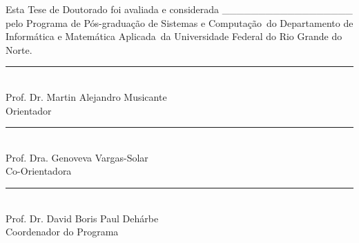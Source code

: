 

\begin{center}
 

  {
    \fontsize{14}{16}
    \selectfont

    \textsc{\titulo}


  }

    \vfill

    {
      \fontsize{12}{14}
      \selectfont

      \autor

    }



    \vfill

\end{center}

    {
      \fontsize{12}{14}
      \selectfont

      \noindent Esta Tese de Doutorado foi avaliada e
      considerada \_\_\_\_\_\_\_\_\_\_\_\_\_\_\_\_\_\_ pelo Programa de
      P\'os-gradua\c c\~ao de Sistemas e Computa\c c\~ao\ do Departamento de
      Inform\'atica e Matem\'atica Aplicada\ da Universidade Federal do Rio Grande do Norte.

    }

\begin{center}

    \vfill

 
    {
      \fontsize{11}{13}
      \selectfont

    \noindent
    \rule{75mm}{0.2mm}\\
    Prof. Dr. Martin Alejandro Musicante\\
    Orientador\\

    }
    
        \vfill

 
    {
      \fontsize{11}{13}
      \selectfont


    \noindent
    \rule{75mm}{0.2mm}\\
    Prof. Dra. Genoveva Vargas-Solar\\
    Co-Orientadora

    }


    \vfill

    {
      \fontsize{11}{13}
      \selectfont

    \noindent
    \rule{75mm}{0.2mm}\\
   Prof. Dr. David Boris Paul Deh\'arbe\\
    Coordenador do Programa

    }

 
    \vfill

\end{center}

